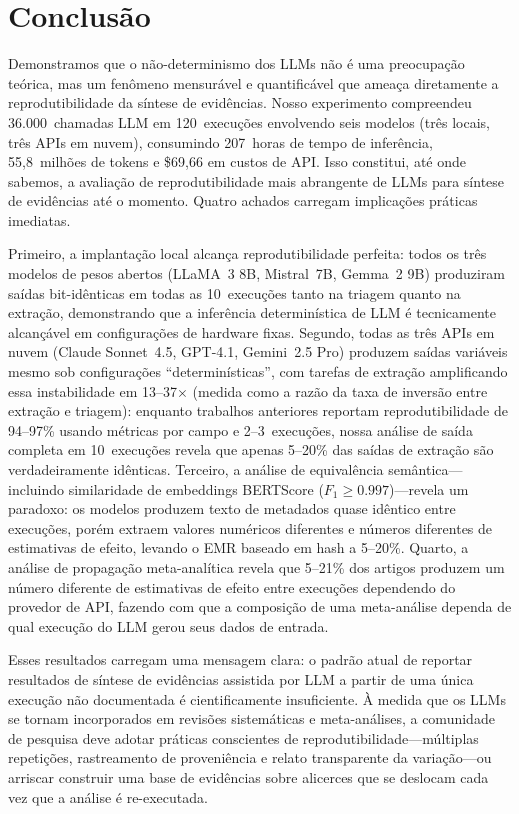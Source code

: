 \documentclass[12pt, a4paper]{article}
\begin{document}
\section{Conclusão}

Demonstramos que o não-determinismo dos LLMs não é uma preocupação teórica, mas um fenômeno mensurável e quantificável que ameaça diretamente a reprodutibilidade da síntese de evidências.
Nosso experimento compreendeu 36.000~chamadas LLM em 120~execuções envolvendo seis modelos (três locais, três APIs em nuvem), consumindo 207~horas de tempo de inferência, 55,8~milhões de tokens e \$69,66 em custos de API.
Isso constitui, até onde sabemos, a avaliação de reprodutibilidade mais abrangente de LLMs para síntese de evidências até o momento.
Quatro achados carregam implicações práticas imediatas.

Primeiro, a implantação local alcança reprodutibilidade perfeita: todos os três modelos de pesos abertos (LLaMA~3 8B, Mistral~7B, Gemma~2 9B) produziram saídas bit-idênticas em todas as 10~execuções tanto na triagem quanto na extração, demonstrando que a inferência determinística de LLM é tecnicamente alcançável em configurações de hardware fixas.
Segundo, todas as três APIs em nuvem (Claude Sonnet~4.5, GPT-4.1, Gemini~2.5 Pro) produzem saídas variáveis mesmo sob configurações ``determinísticas'', com tarefas de extração amplificando essa instabilidade em 13--37$\times$ (medida como a razão da taxa de inversão entre extração e triagem): enquanto trabalhos anteriores reportam reprodutibilidade de 94--97\% usando métricas por campo e 2--3~execuções, nossa análise de saída completa em 10~execuções revela que apenas 5--20\% das saídas de extração são verdadeiramente idênticas.
Terceiro, a análise de equivalência semântica---incluindo similaridade de embeddings BERTScore ($F_1{\geq}0.997$)---revela um paradoxo: os modelos produzem texto de metadados quase idêntico entre execuções, porém extraem valores numéricos diferentes e números diferentes de estimativas de efeito, levando o EMR baseado em hash a 5--20\%.
Quarto, a análise de propagação meta-analítica revela que 5--21\% dos artigos produzem um número diferente de estimativas de efeito entre execuções dependendo do provedor de API, fazendo com que a composição de uma meta-análise dependa de qual execução do LLM gerou seus dados de entrada.

Esses resultados carregam uma mensagem clara: o padrão atual de reportar resultados de síntese de evidências assistida por LLM a partir de uma única execução não documentada é cientificamente insuficiente.
À medida que os LLMs se tornam incorporados em revisões sistemáticas e meta-análises, a comunidade de pesquisa deve adotar práticas conscientes de reprodutibilidade---múltiplas repetições, rastreamento de proveniência e relato transparente da variação---ou arriscar construir uma base de evidências sobre alicerces que se deslocam cada vez que a análise é re-executada.
\end{document}
